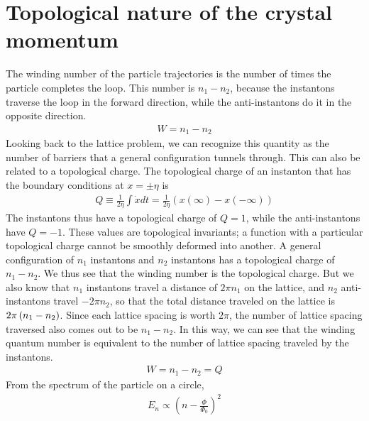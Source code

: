 \documentclass{article}
\begin{document}
\section{Topological nature of the crystal momentum}
The winding number of the particle trajectories is the number of times the particle completes the loop. This number is \(n_1 - n_2\), because the instantons traverse the loop in the forward direction, while the anti-instantons do it in the opposite direction.
\begin{equation}\begin{aligned}
	W = n_1 - n_2
\end{aligned}\end{equation}
Looking back to the lattice problem, we can recognize this quantity as the number of barriers that a general configuration tunnels through. This can also be related to a topological charge. The topological charge of an instanton that has the boundary conditions at \(x = \pm \eta\) is
\begin{equation}\begin{aligned}
	Q \equiv \frac{1}{2\eta}\int \dot x dt = \frac{1}{2\eta}\left(x(\infty) - x(-\infty)\right)
\end{aligned}\end{equation}
The instantons thus have a topological charge of \(Q = 1\), while the anti-instantons have \(Q = -1\). These values are topological invariants; a function with a particular topological charge cannot be smoothly deformed into another. A general configuration of \(n_1\) instantons and \(n_2\) instantons has a topological charge of \(n_1 - n_2\). We thus see that the winding number is the topological charge.
But we also know that \(n_1\) instantons travel a distance of \(2\pi n_1\) on the lattice, and \(n_2\) anti-instantons travel \(-2\pi n_2\), so that the total distance traveled on the lattice is \(2\pi\left({n_1 - n_2}\right)\). Since each lattice spacing is worth \(2\pi\), the number of lattice spacing traversed also comes out to be \(n_1 - n_2\). In this way, we can see that the winding quantum number is equivalent to the number of lattice spacing traveled by the instantons.
\begin{equation}\begin{aligned}
	W = n_1 - n_2 = Q
\end{aligned}\end{equation}
From the spectrum of the particle on a circle,
\begin{equation}\begin{aligned}
	E_n \propto (n - \frac{\Phi}{\Phi_0})^2
\end{aligned}\end{equation}
\end{document}
